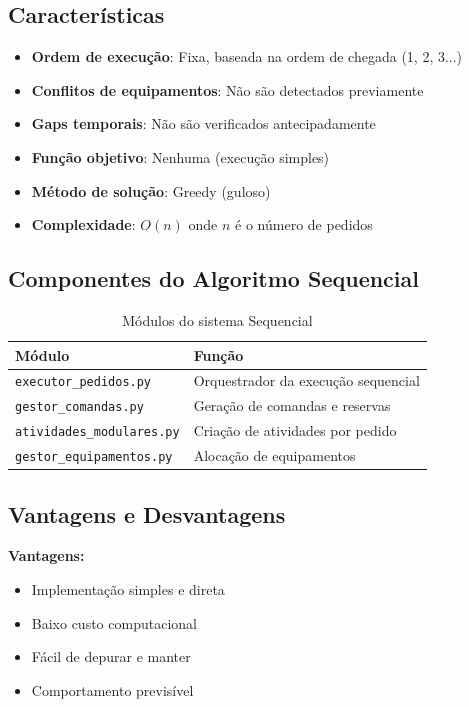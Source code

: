 \documentclass[12pt,a4paper]{article}
\begin{document}
\subsection{Características}

\begin{itemize}
    \item \textbf{Ordem de execução}: Fixa, baseada na ordem de chegada (1, 2, 3...)
    \item \textbf{Conflitos de equipamentos}: Não são detectados previamente
    \item \textbf{Gaps temporais}: Não são verificados antecipadamente
    \item \textbf{Função objetivo}: Nenhuma (execução simples)
    \item \textbf{Método de solução}: Greedy (guloso)
    \item \textbf{Complexidade}: $O(n)$ onde $n$ é o número de pedidos
\end{itemize}

\subsection{Componentes do Algoritmo Sequencial}

\begin{table}[h]
\centering
\begin{tabular}{ll}
\toprule
\textbf{Módulo} & \textbf{Função} \\
\midrule
\texttt{executor\_pedidos.py} & Orquestrador da execução sequencial \\
\texttt{gestor\_comandas.py} & Geração de comandas e reservas \\
\texttt{atividades\_modulares.py} & Criação de atividades por pedido \\
\texttt{gestor\_equipamentos.py} & Alocação de equipamentos \\
\bottomrule
\end{tabular}
\caption{Módulos do sistema Sequencial}
\end{table}

\subsection{Vantagens e Desvantagens}

\textbf{Vantagens:}
\begin{itemize}
    \item Implementação simples e direta
    \item Baixo custo computacional
    \item Fácil de depurar e manter
    \item Comportamento previsível
\end{itemize}
\end{document}
